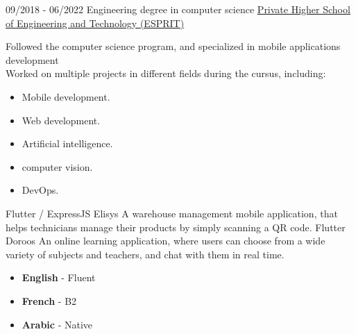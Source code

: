 \documentclass[9pt]{developercv} %
\begin{document}
\vspace{-10 pt}
\begin{entrylist}
	\entry
	{09/2018 - 06/2022}
	{Engineering degree in computer science}
	{\href{https://www.esprit.tn}{Private Higher School of Engineering and Technology (ESPRIT)}}
	{Followed the computer science program, and specialized in mobile applications development\\Worked on multiple projects in different fields during the cursus, including:
		\begin{itemize}[noitemsep,topsep=0pt,parsep=0pt,partopsep=0pt, leftmargin=0pt]
			\item Mobile development.
			\item Web development.
			\item Artificial intelligence.
			\item computer vision.
			\item DevOps.
		\end{itemize}
	}
\end{entrylist}

\begin{entrylist}
	\entry
	{Flutter / ExpressJS}
	{Elisys}
	{
	}
	{
		A warehouse management mobile application, that helps technicians manage their products by simply scanning a QR code.
	}
	\entry
	{Flutter}
	{Doroos}
	{
	}
	{
		An online learning application, where users can choose from a wide variety of subjects and teachers, and chat with them in real time.
	}
\end{entrylist}




\vspace{-10 pt}
\vspace{-6pt}

\begin{itemize}[noitemsep,topsep=0pt,parsep=0pt,partopsep=0pt, leftmargin=0.18\textwidth]
	\item \textbf{English} - Fluent
	\item \textbf{French} - B2
	\item \textbf{Arabic} - Native
\end{itemize}


\end{document}
